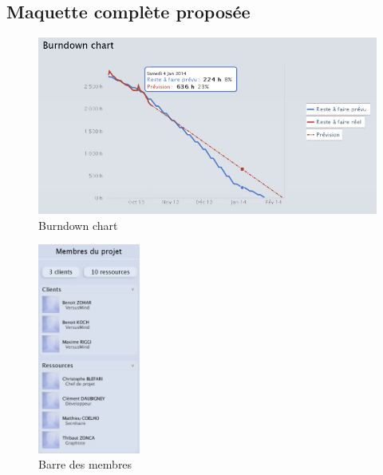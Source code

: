 \documentclass[12pt]{report}
\begin{document}
\begin{appendices}
	\chapter{Maquette complète proposée}
	
	\begin{figure}[H]
	\centering
	\includegraphics[width=1\textwidth]{pictures/notreMaquette/burndown.jpg}
	\caption{Burndown chart}
	\label{10}
\end{figure}

\begin{figure}[H]
	\centering
	\includegraphics[width=0.3\textwidth]{pictures/notreMaquette/barreMembres.jpg}
	\caption{Barre des membres}
	\label{11}
\end{figure}
	

\end{appendices}
\end{document}
